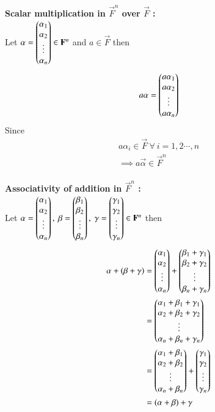 \documentclass[journal,12pt,twocolumn]{IEEEtran}
\begin{document}
{\bf Scalar multiplication in $\vec{F}^n$ over $\vec{F}$ :} \\
Let $\mathbf{\alpha} = \begin{pmatrix}\alpha_1\\ \alpha_2\\ \vdots\\ \alpha_n\end{pmatrix} 
	\in \mathbf{F}^n$ and  $ a \in \vec{F}$ then
\begin{align}
	a\mathbf{\alpha}=\begin{pmatrix}a\alpha_1\\ a\alpha_2\\ \vdots\\ a\alpha_n\end{pmatrix}
\end{align}
Since
\begin{align}
	a\alpha_i \in \vec{F} \ \forall \ i=1,2\cdots,n \\
	\implies a\vec{\alpha} \in \vec{F}^n
\end{align}
\\
{\bf Associativity of addition in $\vec{F}^n$ :} \\
Let $\vec{\alpha}=\myvec{\alpha_1\\ \alpha_2\\ \vdots\\ \alpha_n}, \ 
\vec{\beta}=\myvec{\beta_1\\ \beta_2\\ \vdots\\ \beta_n}, 
\ \vec{\gamma}=\myvec{\gamma_1\\ \gamma_2\\ \vdots\\ \gamma_n} 
\in \vec{F}^n$ then
\begin{align}
	\mathbf{\alpha}+(\mathbf{\beta}+\mathbf{\gamma}) &= 
	\begin{pmatrix}\alpha_1\\ \alpha_2\\ \vdots\\ \alpha_n\end{pmatrix} + 
      \begin{pmatrix}\beta_1+\gamma_1\\ \beta_2+\gamma_2\\ \vdots\\ \beta_n+\gamma_n\end{pmatrix} \\
	&= \begin{pmatrix}\alpha_1+\beta_1+\gamma_1\\ \alpha_2+\beta_2+\gamma_2\\
	\vdots\\ \alpha_n+\beta_n+\gamma_n\end{pmatrix} \\
	&= \begin{pmatrix}\alpha_1+\beta_1\\ \alpha_2+\beta_2\\ \vdots\\
	\alpha_n+\beta_n\end{pmatrix} + \begin{pmatrix}\gamma_1\\ \gamma_2\\ \vdots\\ \gamma_n\end{pmatrix} \\
	&=(\alpha+\beta)+\gamma
\end{align}
\end{document}
